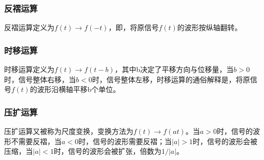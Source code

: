 \documentclass{hitreport}
\begin{document}
\subsubsection{反褶运算}
反褶运算定义为$f\left(t\right)\rightarrow f\left(-t\right)$，即，将原信号$f\left(t\right)$的波形按纵轴翻转。

\subsubsection{时移运算}
时移运算定义为$f\left(t\right)\rightarrow f\left(t-b\right)$，其中b决定了平移方向与位移量，当$b>0$时，信号整体右移，当$b<0$时，信号整体左移，时移运算的通俗解释是，将原信号$f\left(t\right)$的波形沿横轴平移b个单位。

\subsubsection{压扩运算}

压扩运算又被称为尺度变换，变换方法为$f\left(t\right)\rightarrow f\left(at\right)$。当$a>0$时，信号的波形不需要反褶，当$a<0$时，信号的波形需要反褶；当$\lvert a\rvert>1$时，信号的波形会被压缩，当$\lvert a \rvert<1$时，信号的波形会被扩张，倍数为$\left. 1 / \right. {\lvert a\rvert}$。
\end{document}

